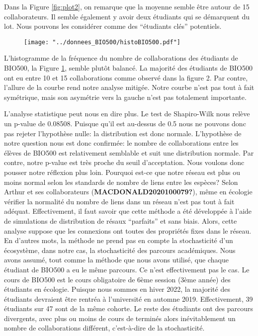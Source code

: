 \documentclass[9pt,twocolumn,twoside,]{pnas-new}
\begin{document}
Dans la Figure \ref{fig:plot2}, on remarque que la moyenne semble être
autour de 15 collaborateurs. Il semble également y avoir deux étudiants
qui se démarquent du lot. Nous pouvons les considérer comme des
``étudiants clés'' potentiels.

\begin{figure}
\centering
\texttt{[image: "../donnees\_BIO500/histoBIO500.pdf"]}
\caption{\label{fig:plot3}}
\end{figure}

L'histogramme de la fréquence du nombre de collaborations des étudiants
de BIO500, la Figure \ref{fig:plot3}, semble plutôt balancé. La majorité
des étudiants de BIO500 ont eu entre 10 et 15 collaborations comme
observé dans la figure 2. Par contre, l'allure de la courbe rend notre
analyse mitigée. Notre courbe n'est pas tout à fait symétrique, mais son
asymétrie vers la gauche n'est pas totalement importante.

L'analyse statistique peut nous en dire plus. Le test de Shapiro-Wilk
nous relève un p-value de 0.08508. Puisque qu'il est au-dessus de 0.5
nous ne pouvons donc pas rejeter l'hypothèse nulle: la distribution est
donc normale. L'hypothèse de notre question nous est donc confirmée: le
nombre de collaborations entre les élèves de BIO500 est relativement
semblable et suit une distribution normale. Par contre, notre p-value
est très proche du seuil d'acceptation. Nous voulons donc pousser notre
réflexion plus loin. Pourquoi est-ce que notre réseau est plus ou moins
normal selon les standards de nombre de liens entre les espèces? Selon
Arthur et ses collaborateurs (\textbf{MACDONALD2020100079?}), même en
écologie vérifier la normalité du nombre de liens dans un réseau n'est
pas tout à fait adéquat. Effectivement, il faut savoir que cette méthode
a été développée à l'aide de simulations de distribution de résaux
``parfaits'' et sans biais. Alors, cette analyse suppose que les
connexions ont toutes des propriétés fixes dans le réseau. En d'autres
mots, la méthode ne prend pas en compte la stochasticité d'un
écosystème, dans notre cas, la stochasticité des parcours académiques.
Nous avons assumé, tout comme la méthode que nous avons utilisé, que
chaque étudiant de BIO500 a eu le même parcours. Ce n'est effectivement
pas le cas. Le cours de BIO500 est le cours obligatoire de 6ème session
(3ème année) des étudiants en écologie. Puisque nous sommes en hiver
2022, la majorité des étudiants devraient être rentréa à l'université en
automne 2019. Effectivement, 39 étudiants sur 47 sont de la même
cohorte. Le reste des étudiants ont des parcours divergents, avec plus
ou moins de cours de terminés alors inévitablement un nombre de
collaborations différent, c'est-à-dire de la stochasticité.
\end{document}

